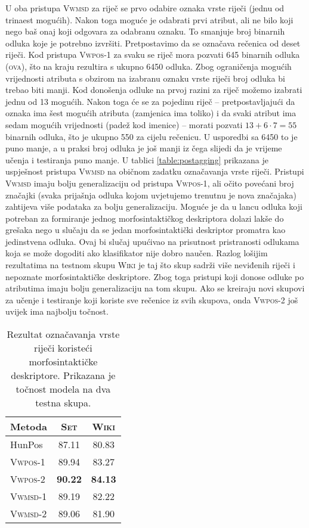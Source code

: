 U oba pristupa \textsc{Vwmsd} za riječ se prvo odabire oznaka vrste riječi
(jednu od trinaest mogućih). Nakon toga moguće je odabrati prvi atribut, ali ne
bilo koji nego baš onaj koji odgovara za odabranu oznaku. To smanjuje broj
binarnih odluka koje je potrebno izvršiti. Pretpostavimo da se označava rečenica
od deset riječi. Kod pristupa \textsc{Vwpos-1} za svaku se riječ mora pozvati
645 binarnih odluka (\textsc{ova}), što na kraju rezultira s ukupno 6450 odluka.
Zbog ograničenja mogućih vrijednosti atributa s obzirom na izabranu oznaku vrste
riječi broj odluka bi trebao biti manji. Kod donošenja odluke na prvoj razini za
riječ možemo izabrati jednu od 13 mogućih. Nakon toga će se za pojedinu riječ --
pretpostavljajući da oznaka ima šest mogućih atributa (zamjenica ima toliko) i da
svaki atribut ima sedam mogućih vrijednosti (padež kod imenice) -- morati pozvati
$13+6 \cdot 7 = 55$ binarnih odluka, što je ukupno 550 za cijelu rečenicu. U
usporedbi sa 6450 to je puno manje, a u praksi broj odluka je još manji iz čega
slijedi da je vrijeme učenja i testiranja puno manje. U tablici
\ref{table:postagging} prikazana je uspješnost pristupa \textsc{Vwmsd} na
običnom zadatku označavanja vrste riječi. Pristupi \textsc{Vwmsd} imaju bolju
generalizaciju od pristupa \textsc{Vwpos-1}, ali očito povećani broj značajki
(svaka prijašnja odluka kojom uvjetujemo trenutnu je nova značajaka) zahtijeva
više podataka za bolju generalizaciju. Moguće je da u lancu odluka koji potreban
za formiranje jednog morfosintaktičkog deskriptora dolazi lakše do grešaka nego
u slučaju da se jedan morfosintaktički deskriptor promatra kao jedinstvena
odluka. Ovaj bi slučaj upućivao na prisutnost pristranosti odlukama koja se može
dogoditi ako klasifikator nije dobro naučen. Razlog lošijim rezultatima na
testnom skupu \textsc{Wiki} je taj što skup sadrži više neviđenih riječi i
nepoznate morfosintaktičke deskriptore. Zbog toga pristupi koji donose odluke po
atributima imaju bolju generalizaciju na tom skupu. Ako se kreiraju novi skupovi
za učenje i testiranje koji koriste sve rečenice iz svih skupova, onda
\textsc{Vwpos-2} još uvijek ima najbolju točnost.

\begin{table}
\centering
\caption[Rezultat označavanja vrste riječi koristeći morfosintaktičke
deskriptore.]{Rezultat označavanja vrste riječi koristeći morfosintaktičke
deskriptore. Prikazana je točnost modela na dva testna skupa.}
\label{table:msdtagging}
\begin{tabular}{|l|c|c|}
\hline
Metoda             & \textsc{Set}   & \textsc{Wiki}  \\ \hline \hline
HunPos             & 87.11          & 80.83          \\
\textsc{Vwpos-1}   & 89.94          & 83.27          \\
\textsc{Vwpos-2}   & \textbf{90.22} & \textbf{84.13} \\
\textsc{Vwmsd-1}   & 89.19          & 82.22          \\
\textsc{Vwmsd-2}   & 89.06          & 81.90          \\ \hline
\end{tabular}
\end{table}
